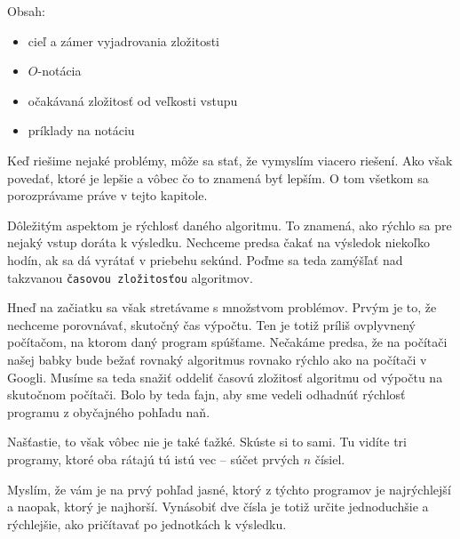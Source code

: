%





Obsah:
\begin{itemize}
    \item cieľ a zámer vyjadrovania zložitosti
    \item $O$-notácia
    \item očakávaná zložitosť od veľkosti vstupu
    \item príklady na notáciu
\end{itemize}

Keď riešime nejaké problémy, môže sa stať, že vymyslím viacero riešení. Ako však povedať, ktoré je
lepšie a vôbec čo to znamená byť lepším. O tom všetkom sa porozprávame práve v tejto kapitole.

Dôležitým aspektom je rýchlosť daného algoritmu. To znamená, ako rýchlo sa pre nejaký vstup doráta k
výsledku. Nechceme predsa čakať na výsledok niekoľko hodín, ak sa dá vyrátať v priebehu sekúnd.
Poďme sa teda zamýšľať nad takzvanou \texttt{časovou zložitosťou} algoritmov.

Hneď na začiatku sa však stretávame s množstvom problémov. Prvým je to, že nechceme porovnávať,
skutočný čas výpočtu. Ten je totiž príliš ovplyvnený počítačom, na ktorom daný program spúšťame.
Nečakáme predsa, že na počítači našej babky bude bežať rovnaký algoritmus rovnako rýchlo ako na
počítači v Googli. Musíme sa teda snažiť oddeliť časovú zložitosť algoritmu od výpočtu na skutočnom
počítači. Bolo by teda fajn, aby sme vedeli odhadnúť  rýchlosť programu z obyčajného pohľadu naň.

Našťastie, to však vôbec nie je také ťažké. Skúste si to sami. Tu vidíte tri programy, ktoré oba
rátajú tú istú vec -- súčet prvých $n$ čísiel.




Myslím, že vám je na prvý pohľad jasné, ktorý z týchto programov je najrýchlejší a naopak, ktorý je
najhorší. Vynásobiť dve čísla je totiž určite jednoduchšie a rýchlejšie, ako pričítavať po
jednotkách k výsledku.




